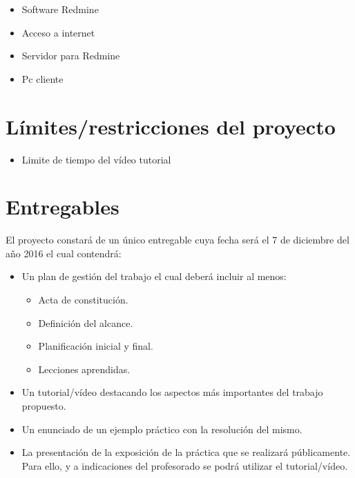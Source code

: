 \documentclass[a4paper,10pt]{scrartcl}
\begin{document}
\begin{itemize}
	\item Software Redmine
	\item Acceso a internet
	\item Servidor para Redmine
	\item Pc cliente
\end{itemize}

\section{Límites/restricciones del proyecto}

\begin{itemize}
	\item Limite de tiempo del vídeo tutorial
\end{itemize}

\section{Entregables}

El proyecto constará de un único entregable cuya fecha será el 7 de diciembre del año 2016 el cual contendrá:
	\begin{itemize}
		\item Un plan de gestión del trabajo el cual deberá incluir al menos:
		
		\begin{itemize}
			\item Acta de constitución.
			\item Definición del alcance.
			\item Planificación inicial y final.
			\item Lecciones aprendidas.
		\end{itemize}
		
		\item Un tutorial/vídeo destacando los aspectos más importantes del trabajo propuesto.
		
		\item Un enunciado de un ejemplo práctico con la resolución del mismo.
		
		\item La presentación de la exposición de la práctica que se realizará públicamente. Para ello, y a indicaciones del profesorado se podrá utilizar el tutorial/vídeo.		
	\end{itemize}
\end{document}
